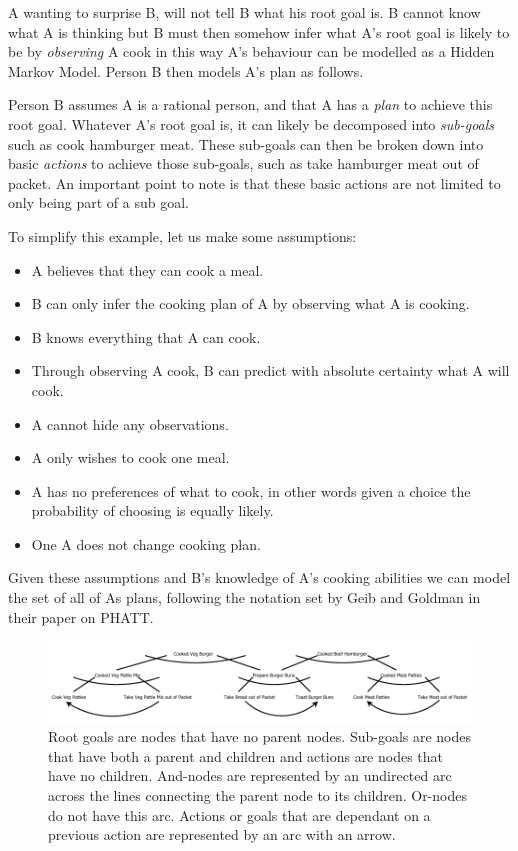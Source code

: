 \documentclass[parskip]{cs4rep}
\begin{document}
A wanting to surprise B, will not tell B what his root goal is. B cannot know what A is thinking but B must then somehow infer what A's root goal is likely to be by \textit{observing} A cook in this way A's behaviour can be modelled as a Hidden Markov Model. Person B then models A's plan as follows. 

Person B assumes A is a rational person, and that A has a \textit{plan} to achieve this root goal. Whatever A's root goal is, it can likely be decomposed into \textit{sub-goals} such as cook hamburger meat. These sub-goals can then be broken down into basic \textit{actions} to achieve those sub-goals, such as take hamburger meat out of packet. An important point to note is that these basic actions are not limited to only being part of a sub goal.

To simplify this example, let us make some assumptions:

\begin{itemize}
\item
A believes that they can cook a meal.
\item
B can only infer the cooking plan of A by observing what A is cooking.
\item
B knows everything that A can cook.
\item
Through observing A cook, B can predict with absolute certainty what A will cook.
\item
A cannot hide any observations.
\item
A only wishes to cook one meal.
\item
A has no preferences of what to cook, in other words given a choice the probability of choosing is equally likely.
\item
One A does not change cooking plan.
\end{itemize}

Given these assumptions and B's knowledge of A's cooking abilities we can model the set of all of As plans, following the notation set by Geib and Goldman in their paper on PHATT.

\begin{figure}[h]
\centering
\includegraphics{images/example-plan-recognition}
\caption{Root goals are nodes that have no parent nodes. Sub-goals are nodes that have both a parent and children and actions are nodes that have no children. And-nodes are represented by an undirected arc across the lines connecting the parent node to its children. Or-nodes do not have this arc. Actions or goals that are dependant on a previous action are represented by an arc with an arrow.}
\label{fig:example-plan-library}
\end{figure} 
\end{document}
